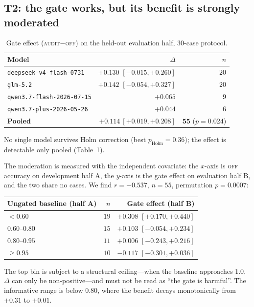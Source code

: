 \documentclass[11pt]{article}
\begin{document}
\subsection{T2: the gate works, but its benefit is strongly moderated}\label{sec:t2}

\begin{table}[t]\centering
\caption{Gate effect (\textsc{audit}$-$\textsc{off}) on the held-out evaluation half,
$30$-case protocol.}
\label{tab:t2}
\begin{tabular}{lrr}
\toprule
Model & $\Delta$ & $n$\\
\midrule
\texttt{deepseek-v4-flash-0731} & $+0.130$ $[-0.015,+0.260]$ & $20$\\
\texttt{glm-5.2}                & $+0.142$ $[-0.054,+0.327]$ & $20$\\
\texttt{qwen3.7-flash-2026-07-15} & $+0.065$ & $9$\\
\texttt{qwen3.7-plus-2026-05-26}  & $+0.044$ & $6$\\
\midrule
\textbf{Pooled} & $\mathbf{+0.114\ [+0.019,+0.208]}$ & $\mathbf{55}$ ($p{=}0.024$)\\
\bottomrule
\end{tabular}
\end{table}

No single model survives Holm correction (best $p_{\text{Holm}}=0.36$); the effect is
detectable only pooled (Table~\ref{tab:t2}).

The moderation is measured with the independent covariate: the $x$-axis is \textsc{off}
accuracy on development half A, the $y$-axis is the gate effect on evaluation half B, and
the two share no cases. We find $r=-0.537$, $n=55$, permutation $p=0.0007$:

\begin{center}
\begin{tabular}{lrr}
\toprule
Ungated baseline (half A) & $n$ & Gate effect (half B)\\
\midrule
$<0.60$        & $19$ & $+0.308$ $[+0.170,+0.440]$\\
$0.60$--$0.80$ & $15$ & $+0.103$ $[-0.054,+0.234]$\\
$0.80$--$0.95$ & $11$ & $+0.006$ $[-0.243,+0.216]$\\
$\geq 0.95$    & $10$ & $-0.117$ $[-0.301,+0.036]$\\
\bottomrule
\end{tabular}
\end{center}

The top bin is subject to a structural ceiling---when the baseline approaches $1.0$,
$\Delta$ can only be non-positive---and must not be read as ``the gate is harmful''. The
informative range is below $0.80$, where the benefit decays monotonically from $+0.31$ to
$+0.01$.
\end{document}
